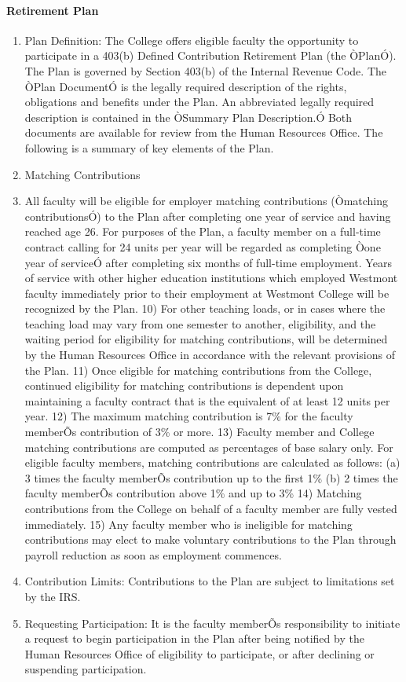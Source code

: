\documentclass[letterpaper, 11pt]{article}
\begin{document}
			\paragraph{Retirement Plan}
				\begin{enumerate}[label=\alph*)]
					\item{Plan Definition:  The College offers eligible faculty the opportunity to participate in a 403(b) Defined Contribution Retirement Plan (the ÒPlanÓ).  The Plan is governed by Section 403(b) of the Internal Revenue Code.  The ÒPlan DocumentÓ is the legally required description of the rights, obligations and benefits under the Plan.  An abbreviated legally required description is contained in the ÒSummary Plan Description.Ó  Both documents are available for review from the Human Resources Office.  The following is a summary of key elements of the Plan.}
					\item{Matching Contributions}
					\item{All faculty will be eligible for employer matching contributions (Òmatching contributionsÓ) to the Plan after completing one year of service and having reached age 26.  For purposes of the Plan, a faculty member on a full-time contract calling for 24 units per year will be regarded as completing Òone year of serviceÓ after completing six months of full-time employment.  Years of service with other higher education institutions which employed Westmont faculty immediately prior to their employment at Westmont College will be recognized by the Plan.}
					10) For other teaching loads, or in cases where the teaching load may vary from one semester to another, eligibility, and the waiting period for eligibility for matching contributions, will be determined by the Human Resources Office in accordance with the relevant provisions of the Plan.
					11) Once eligible for matching contributions from the College, continued eligibility for matching contributions is dependent upon maintaining a faculty contract that is the equivalent of at least 12 units per year.
					12) The maximum matching contribution is 7\% for the faculty memberÕs contribution of 3\% or more.
					13) Faculty member and College matching contributions are computed as percentages of base salary only.  For eligible faculty members, matching contributions are calculated as follows:
					(a) 3 times the faculty memberÕs contribution up to the first 1\%
					(b) 2 times the faculty memberÕs contribution above 1\% and up to 3\%
					14) Matching contributions from the College on behalf of a faculty member are fully vested immediately.
					15) Any faculty member who is ineligible for matching contributions may elect to make voluntary contributions to the Plan through payroll reduction as soon as employment commences.
					\item{Contribution Limits:  Contributions to the Plan are subject to limitations set by the IRS.}
					\item{Requesting Participation:  It is the faculty memberÕs responsibility to initiate a request to begin participation in the Plan after being notified by the Human Resources Office of eligibility to participate, or after declining or suspending participation.}
				\end{enumerate}
\end{document}
